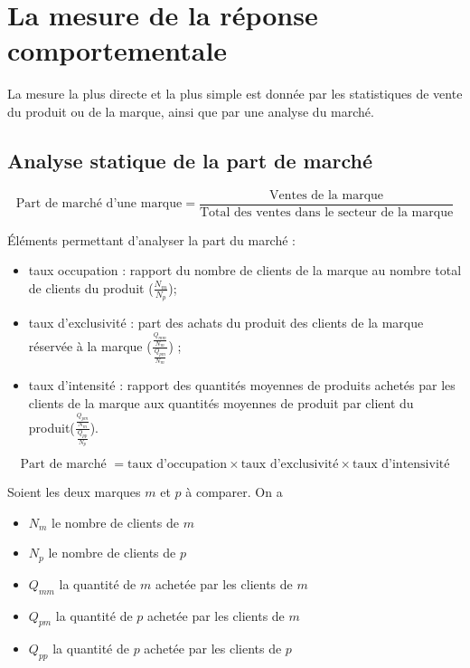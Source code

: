	

	
	\section{La mesure de la réponse comportementale}
	
		
		La mesure la plus directe et la plus simple est donnée par les statistiques de vente du produit ou de la marque, ainsi que par une analyse du marché.
	
		\subsection{Analyse statique de la part de marché}
		
		$$\text{Part de marché d'une marque} = \frac{\text{Ventes de la marque}}{\text{Total des ventes dans le secteur de la marque}}$$
	
	
		Éléments permettant d'analyser la part du marché :
		\begin{itemize}
			\item taux occupation : rapport du nombre de clients de la marque au nombre total de clients du produit ($\frac{N_m}{N_p}$);
			\item taux d'exclusivité : part des achats du produit des clients de la marque réservée à la marque ($\frac{ \frac{Q_{mm}}{N_m} }{ \frac{Q_{pm}}{N_m} }$) ;
			\item taux d'intensité : rapport des quantités moyennes de produits achetés par les clients de la marque aux quantités moyennes de produit par client du produit($\frac{ \frac{Q_{pm}}{N_m} }{ \frac{Q_{pp}}{N_p} }$).
		\end{itemize}
		
		$$\text{Part de marché } = \text{taux d'occupation} \times \text{taux d'exclusivité} \times \text{taux d'intensivité}$$
		
		Soient les deux marques $m$ et $p$ à comparer. On a
		
		\begin{itemize}
			\item $N_m$ le nombre de clients de $m$
			\item $N_p$ le nombre de clients de $p$
			\item $Q_{mm}$ la quantité de $m$ achetée par les clients de $m$
			\item $Q_{pm}$ la quantité de $p$ achetée par les clients de $m$
			\item $Q_{pp}$ la quantité de $p$ achetée par les clients de $p$
		\end{itemize}
		
